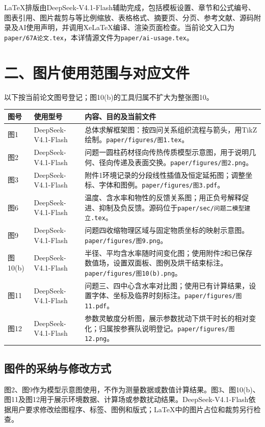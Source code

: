 \documentclass[UTF8,a4paper,zihao=-4]{ctexart}
\begin{document}
LaTeX排版由DeepSeek-V4.1-Flash辅助完成，包括模板设置、章节和公式编号、图表引用、图片裁剪与等比例缩放、表格格式、摘要页、分页、参考文献、源码附录及AI使用声明，并调用XeLaTeX编译、渲染页面检查。当前论文入口为\texttt{paper/67A论文.tex}，本详情源文件为\texttt{paper/ai-usage.tex}。

\clearpage
\section*{二、图片使用范围与对应文件}
以下按当前论文图号登记；图10(b)的工具归属不扩大为整张图10。
\par\noindent\begin{tabularx}{\textwidth}{@{}p{}p{}L@{}}
\toprule 图号&使用型号&内容、目的及当前文件\\\midrule
图1&DeepSeek-V4.1-Flash&总体求解框架图：按四问关系组织流程与箭头，用TikZ绘制。\texttt{paper/figures/图1.tex}。\\
图2&DeepSeek-V4.1-Flash&问题一圆柱药材径向传热传质模型示意图，用于说明几何、径向传递及表面交换。\texttt{paper/figures/图2.png}。\\
图3&DeepSeek-V4.1-Flash&附件1环境记录的分段线性插值及恒定延拓图；调整坐标、字体和图例。\texttt{paper/figures/图3.pdf}。\\
图6&DeepSeek-V4.1-Flash&温度、含水率和物性的反馈关系图；用正负号解释促进、抑制及负反馈。源码位于\texttt{paper/sec/问题二模型建立.tex}。\\
图9&DeepSeek-V4.1-Flash&问题四收缩物理区域与固定物质坐标的映射示意图。\texttt{paper/figures/图9.png}。\\
图10(b)&DeepSeek-V4.1-Flash&半径、平均含水率随时间变化图；使用附件2和已保存数值场，设置双面板、图例及烘干结束标注。\texttt{paper/figures/图10(b).png}。\\
图11&DeepSeek-V4.1-Flash&问题三、四中心含水率对比图；使用已有计算结果，设置字体、坐标及临界时刻标注。\texttt{paper/figures/图11.pdf}。\\
图12&DeepSeek-V4.1-Flash&参数灵敏度分析图，展示参数扰动下烘干时长的相对变化；归属按参赛队说明登记。\texttt{paper/figures/图12.png}。\\
\bottomrule
\end{tabularx}

\subsection*{图件的采纳与修改方式}
图2、图9作为模型示意图使用，不作为测量数据或数值计算结果。图3、图10(b)、图11及图12用于展示环境数据、计算场或参数扰动结果。DeepSeek-V4.1-Flash依据用户要求修改绘图程序、标签、图例和版式；LaTeX中的图片占位和裁剪另行检查。
\end{document}
